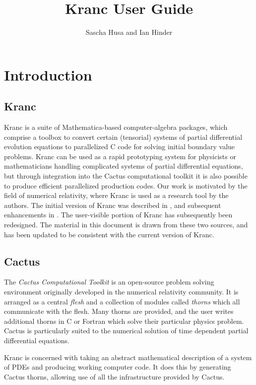 \documentclass{report}
\title{Kranc User Guide}
\author{Sascha Husa and Ian Hinder}
\begin{document}
\maketitle
\tableofcontents
\chapter{Introduction}

\section{Kranc}
Kranc is a suite of Mathematica-based computer-algebra packages, which
comprise a toolbox to convert certain (tensorial) systems of partial
differential evolution equations to parallelized C code for
solving initial boundary value problems.  Kranc can be used as a rapid
prototyping system for physicists or mathematicians handling
complicated systems of partial differential equations, but through
integration into the Cactus computational toolkit it is also possible
to produce efficient parallelized production codes.  Our work is
motivated by the field of numerical relativity, where Kranc is used as
a research tool by the authors.  The initial version of Kranc was
described in \cite{KrancPaper}, and subsequent enhancements in
\cite{IHPhDThesis}.  The user-visible portion of Kranc has
subsequently been redesigned.  The material in this document is drawn
from these two sources, and has been updated to be consistent with the
current version of Kranc.

\section{Cactus}

The {\em Cactus Computational Toolkit} is an open-source problem
solving environment originally developed in the numerical relativity
community.  It is arranged as a central {\em flesh} and a collection
of modules called {\em thorns} which all communicate with the
flesh.  Many thorns are provided, and the user writes additional thorns
in C or Fortran which solve their particular physics problem.  Cactus
is particularly suited to the numerical solution of time dependent
partial differential equations.

Kranc is concerned with taking an abstract mathematical description of
a system of PDEs and producing working computer code.  It does this by
generating Cactus thorns, allowing use of all the infrastructure
provided by Cactus.
\end{document}
